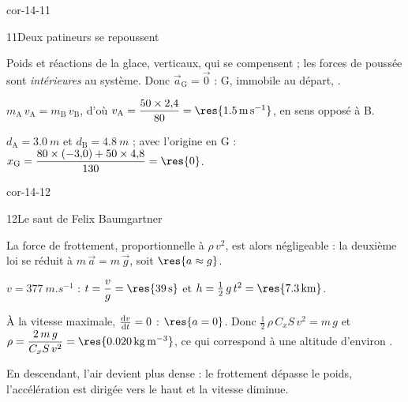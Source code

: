 \begin{blocLivre}{cor-14-11}
\begin{corrige}{11}{Deux patineurs se repoussent}
\begin{questions}
\item Poids et réactions de la glace, verticaux, qui se compensent ; les forces de poussée sont \emph{intérieures} au
système. Donc $\vec{a}_\mathrm{G}=\vec{0}$ : G, immobile au départ, .
\item $m_\mathrm{A}\,v_\mathrm{A}=m_\mathrm{B}\,v_\mathrm{B}$, d'où $v_\mathrm{A}=\dfrac{50\times2{,}4}{80}=\res{\qty{1,5}{m.s^{-1}}}$, en sens
opposé à B.
\item $d_\mathrm{A}=\qty{3,0}{m}$ et $d_\mathrm{B}=\qty{4,8}{m}$ ; avec l'origine en G :
$x_\mathrm{G}=\dfrac{80\times(-3{,}0)+50\times4{,}8}{130}=\res{0}$.
\end{questions}
\end{corrige}
\end{blocLivre}
\begin{blocLivre}{cor-14-12}
\begin{corrige}{12}{Le saut de Felix Baumgartner}
\begin{questions}
\item La force de frottement, proportionnelle à $\rho\,v^2$, est alors négligeable : la deuxième loi se réduit à
$m\,\vec{a}=m\,\vec{g}$, soit $\res{a\approx g}$.
\item $v=\qty{377}{m.s^{-1}}$ : $t=\dfrac{v}{g}=\res{\qty{39}{s}}$ et $h=\frac12\,g\,t^2=\res{\qty{7,3}{km}}$.
\item À la vitesse maximale, $\frac{\mathrm{d}v}{\mathrm{d}t}=0$ : $\res{a=0}$. Donc $\frac12\,\rho\,C_xS\,v^2=m\,g$ et
$\rho=\dfrac{2\,m\,g}{C_xS\,v^2}=\res{\qty{0,020}{kg.m^{-3}}}$, ce qui correspond à une altitude d'environ .
\item En descendant, l'air devient plus dense : le frottement dépasse le poids, l'accélération est dirigée vers le haut
et la vitesse diminue.
\end{questions}
\end{corrige}
\end{blocLivre}
